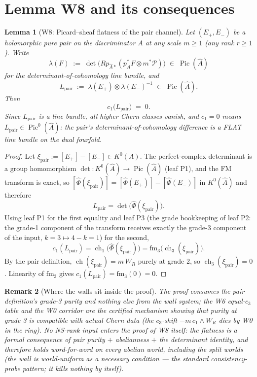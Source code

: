 \documentclass[11pt]{article}
\newtheorem{lemma}{Lemma}[section]
\newtheorem{remark}[lemma]{Remark}
\newcommand{\WR}{W_R}
\newcommand{\ch}{\operatorname{ch}}
\newcommand{\Pic}{\operatorname{Pic}}
\newcommand{\KA}{A}
\newcommand{\KAd}{\widehat{A}}
\begin{document}
\section{Lemma W8 and its consequences}

\begin{lemma}[W8: Picard--sheaf flatness of the pair channel]
\label{lem:W8}
Let $(E_+,E_-)$ be a holomorphic pure pair on the discriminator $\KA$ at any
scale $m\ge 1$ (any rank $r\ge 1$). Write
\[
\lambda(F) \;:=\; \det\bigl(Rp_{\KAd *}(p_\KA^*F\otimes m^*\mathcal{P})\bigr)
\;\in\; \Pic(\KAd)
\]
for the determinant-of-cohomology line bundle, and
\[
L_{\mathrm{pair}} \;:=\; \lambda(E_+)\otimes \lambda(E_-)^{-1}\;\in\;\Pic(\KAd).
\]
Then
\[
c_1\bigl(L_{\mathrm{pair}}\bigr) \;=\; 0.
\]
Since $L_{\mathrm{pair}}$ is a line bundle, all higher Chern classes vanish,
and $c_1 = 0$ means $L_{\mathrm{pair}} \in \Pic^0(\KAd)$: the pair's
determinant-of-cohomology difference is a FLAT line bundle on the dual
fourfold.
\end{lemma}

\begin{proof}
Let $\xi_{\mathrm{pair}} := [E_+] - [E_-] \in K^0(\KA)$. The perfect-complex
determinant is a group homomorphism $\det : K^0(\KAd) \to \Pic(\KAd)$ (leaf
P1), and the FM transform is exact, so
$[\widehat\Phi(\xi_{\mathrm{pair}})] = [\widehat\Phi(E_+)] -
[\widehat\Phi(E_-)]$ in $K^0(\KAd)$ and therefore
\[
L_{\mathrm{pair}}
= \det\bigl(\widehat\Phi(\xi_{\mathrm{pair}})\bigr).
\]
Using leaf P1 for the first equality and leaf P3 (the grade bookkeeping of
leaf P2: the grade-1 component of the transform receives exactly the
grade-3 component of the input, $k=3 \mapsto 4-k=1$) for the second,
\[
c_1(L_{\mathrm{pair}})
= \ch_1\bigl(\widehat\Phi(\xi_{\mathrm{pair}})\bigr)
= \mathrm{fm}_3\bigl(\ch_3(\xi_{\mathrm{pair}})\bigr).
\]
By the pair definition, $\ch(\xi_{\mathrm{pair}}) = m\,\WR$ purely at
grade 2, so $\ch_3(\xi_{\mathrm{pair}}) = 0$. Linearity of $\mathrm{fm}_3$
gives $c_1(L_{\mathrm{pair}}) = \mathrm{fm}_3(0) = 0$.
\end{proof}

\begin{remark}[Where the walls sit inside the proof]
The proof consumes the pair definition's grade-3 purity and nothing else
from the wall system; the W6 equal-$c_3$ table and the W0 corridor are the
certified \emph{mechanism} showing that purity at grade 3 is compatible
with actual Chern data (the $c_3$-shift $-m\,c_1\wedge\WR$ dies by W0 in
the ring). No NS-rank input enters the proof of W8 itself: the flatness is
a formal consequence of pair purity $+$ abelianness $+$ the determinant
identity, and therefore holds word-for-word on every abelian world,
including the split worlds (the wall is world-uniform as a necessary
condition --- the standard consistency-probe pattern; it kills nothing by
itself).
\end{remark}
\end{document}
